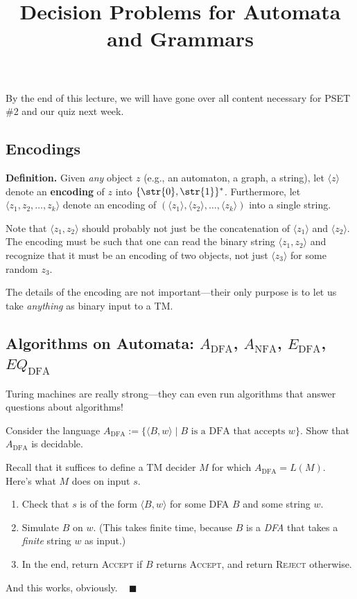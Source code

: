 \title{Decision Problems for Automata and Grammars}



By the end of this lecture, we will have gone over
all content necessary for PSET \#2 and our quiz next week.

\subsection{Encodings}

\textbf{Definition.}
Given \emph{any} object $z$
(e.g., an automaton, a graph, a string),
let $\langle z \rangle$ denote an \textbf{encoding} of $z$
into $\{\str{0}, \str{1}\}^*$.
Furthermore, let $\langle z_1, z_2, \dots, z_k \rangle$
denote an encoding of
$(\langle z_1 \rangle, \langle z_2 \rangle, \dots, \langle z_k \rangle)$
into a single string.

\begin{remark}
    Note that $\langle z_1, z_2 \rangle$ should probably not just be
    the concatenation of $\langle z_1 \rangle$ and $\langle z_2 \rangle$.
    The encoding must be such that one can read the binary string
    $\langle z_1, z_2 \rangle$ and recognize that
    it must be an encoding of two objects,
    not just $\langle z_3 \rangle$ for some random $z_3$.
\end{remark}

The details of the encoding are not important---their
only purpose is to let us take \emph{anything}
as binary input to a TM.

\subsection{Algorithms on Automata:
$A_{\mathrm{DFA}}$, $A_{\mathrm{NFA}}$,
$E_{\mathrm{DFA}}$, $EQ_{\mathrm{DFA}}$}

Turing machines are really strong---they
can even run algorithms that answer questions about algorithms!

\begin{problem}
    Consider the language
    $A_{\mathrm{DFA}} := \{\langle B, w \rangle \mid
    B \text{ is a DFA that accepts } w\}$.
    Show that $A_{\mathrm{DFA}}$ is decidable.
\end{problem}

\begin{solution}
    Recall that it suffices to define a TM decider $M$
    for which $A_{\mathrm{DFA}} = L(M)$.
    Here's what $M$ does on input $s$.
    \begin{enumerate}
        \item Check that $s$ is of the form $\langle B, w \rangle$
        for some DFA $B$ and some string $w$.
        \item Simulate $B$ on $w$.
        (This takes finite time,
        because $B$ is a \emph{DFA} that takes
        a \emph{finite} string $w$ as input.)
        \item In the end, return \textsc{Accept}
        if $B$ returns \textsc{Accept},
        and return \textsc{Reject} otherwise.
    \end{enumerate}
    And this works, obviously. ~ $\blacksquare$
\end{solution}

